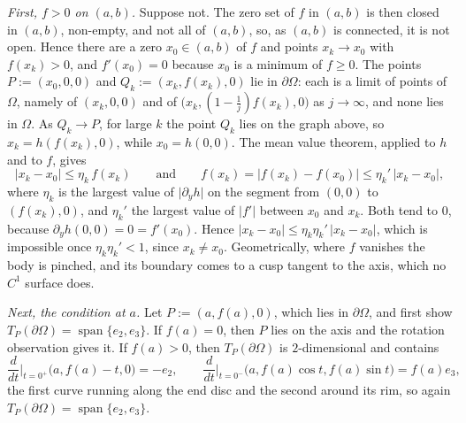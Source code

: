 \begin{exercisesolution}
\begin{enumerate}[label=\textbf{(\alph*)}]
    \emph{First, $f>0$ on $(a,b)$.} Suppose not. The zero set of $f$ in $(a,b)$ is then closed in
    $(a,b)$, non-empty, and not all of $(a,b)$, so, as $(a,b)$ is connected, it is not open.
    Hence there are a zero $x_0 \in (a,b)$ of $f$ and points $x_k \to x_0$ with $f(x_k) > 0$, and
    $f'(x_0) = 0$ because $x_0$ is a minimum of $f \geq 0$. The points $P := (x_0,0,0)$ and
    $Q_k := (x_k, f(x_k), 0)$ lie in $\partial\Omega$: each is a limit of points of $\Omega$,
    namely of $(x_k,0,0)$ and of $\big(x_k, (1-\tfrac1j)f(x_k), 0\big)$ as $j \to \infty$, and
    none lies in $\Omega$. As $Q_k \to P$, for large $k$ the point $Q_k$ lies on the graph above,
    so $x_k = h(f(x_k),0)$, while $x_0 = h(0,0)$. The mean value theorem, applied to $h$ and to
    $f$, gives
    \[\lvert x_k - x_0\rvert \leq \eta_k\,f(x_k) \qquad\text{and}\qquad
      f(x_k) = \lvert f(x_k) - f(x_0)\rvert \leq \eta_k'\,\lvert x_k - x_0\rvert,\]
    where $\eta_k$ is the largest value of $\lvert\partial_y h\rvert$ on the segment from $(0,0)$
    to $(f(x_k),0)$, and $\eta_k'$ the largest value of $\lvert f'\rvert$ between $x_0$ and $x_k$.
    Both tend to $0$, because $\partial_y h(0,0) = 0 = f'(x_0)$. Hence
    $\lvert x_k - x_0\rvert \leq \eta_k\eta_k'\,\lvert x_k - x_0\rvert$, which is impossible once
    $\eta_k\eta_k' < 1$, since $x_k \neq x_0$. Geometrically, where $f$ vanishes the body is
    pinched, and its boundary comes to a cusp tangent to the axis, which no $C^1$ surface does.

    \emph{Next, the condition at $a$.} Let $P := (a,f(a),0)$, which lies in $\partial\Omega$, and
    first show $T_P(\partial\Omega) = \operatorname{span}\{e_2,e_3\}$. If $f(a) = 0$, then $P$
    lies on the axis and the rotation observation gives it. If $f(a) > 0$, then
    $T_P(\partial\Omega)$ is $2$-dimensional and contains
    \[\frac{d}{dt}\Big|_{t=0^+}\big(a,f(a)-t,0\big) = -e_2, \qquad
      \frac{d}{dt}\Big|_{t=0^-}\big(a,f(a)\cos t,f(a)\sin t\big) = f(a)e_3,\]
    the first curve running along the end disc and the second around its rim, so again
    $T_P(\partial\Omega) = \operatorname{span}\{e_2,e_3\}$.


\end{enumerate}
\end{exercisesolution}
